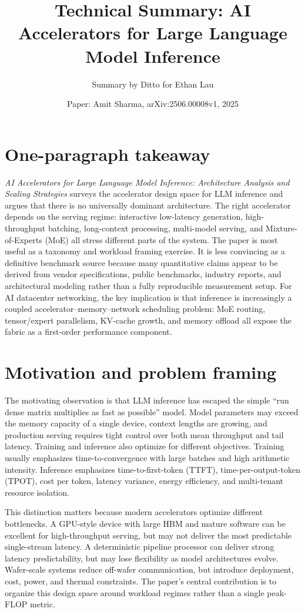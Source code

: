 \documentclass[10pt]{article}
\title{Technical Summary: AI Accelerators for Large Language Model Inference}
\author{Summary by Ditto for Ethan Lau}
\date{Paper: Amit Sharma, arXiv:2506.00008v1, 2025}
\begin{document}
\maketitle
\vspace{-0.8em}

\section{One-paragraph takeaway}
\textit{AI Accelerators for Large Language Model Inference: Architecture Analysis and Scaling Strategies} surveys the accelerator design space for LLM inference and argues that there is no universally dominant architecture. The right accelerator depends on the serving regime: interactive low-latency generation, high-throughput batching, long-context processing, multi-model serving, and Mixture-of-Experts (MoE) all stress different parts of the system. The paper is most useful as a taxonomy and workload framing exercise. It is less convincing as a definitive benchmark source because many quantitative claims appear to be derived from vendor specifications, public benchmarks, industry reports, and architectural modeling rather than a fully reproducible measurement setup. For AI datacenter networking, the key implication is that inference is increasingly a coupled accelerator--memory--network scheduling problem: MoE routing, tensor/expert parallelism, KV-cache growth, and memory offload all expose the fabric as a first-order performance component.

\section{Motivation and problem framing}
The motivating observation is that LLM inference has escaped the simple ``run dense matrix multiplies as fast as possible'' model. Model parameters may exceed the memory capacity of a single device, context lengths are growing, and production serving requires tight control over both mean throughput and tail latency. Training and inference also optimize for different objectives. Training usually emphasizes time-to-convergence with large batches and high arithmetic intensity. Inference emphasizes time-to-first-token (TTFT), time-per-output-token (TPOT), cost per token, latency variance, energy efficiency, and multi-tenant resource isolation.

This distinction matters because modern accelerators optimize different bottlenecks. A GPU-style device with large HBM and mature software can be excellent for high-throughput serving, but may not deliver the most predictable single-stream latency. A deterministic pipeline processor can deliver strong latency predictability, but may lose flexibility as model architectures evolve. Wafer-scale systems reduce off-wafer communication, but introduce deployment, cost, power, and thermal constraints. The paper's central contribution is to organize this design space around workload regimes rather than a single peak-FLOP metric.
\end{document}
